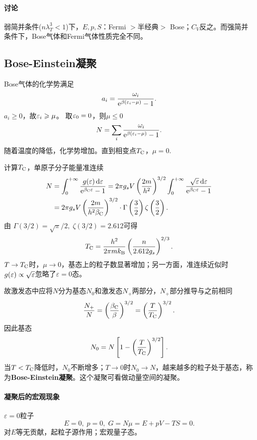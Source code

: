 \paragraph*{讨论}弱简并条件($n\lambda_T^3<1$)下，$E,p,S$：Fermi $>$半经典$>$ Bose；$C_V$反之。而强简并条件下，Bose气体和Fermi气体性质完全不同。
\subsection{Bose-Einstein凝聚}
Bose气体的化学势满足
\[
	a_i=\frac{\omega_i}{\mathop{}\!\mathrm{e}^{\beta(\varepsilon_i-\mu)}-1}.
\]
$a_i\geqslant 0$，故$\varepsilon_i\geqslant \mu$。
取$\varepsilon_0=0$，则$\mu\leqslant 0$
\[
	N=\sum_i\frac{\omega_i}{\mathop{}\!\mathrm{e}^{\beta(\varepsilon_i-\mu)}-1}.
\]
随着温度的降低，化学势增加。直到相变点$T_\mathrm C$，$\mu=0$.

计算$T_\mathrm C$，单原子分子能量准连续
\begin{align*}
	N&=\int_0^{+\infty}\frac{g(\varepsilon)\mathop{}\!\mathrm{d}\varepsilon}{\mathop{}\!\mathrm{e}^{\beta_\mathrm C\varepsilon}-1}=2\pi g_sV\left(\frac{2m}{h^2}\right)^{3/2}\int_0^{+\infty}\frac{\sqrt\varepsilon\mathop{}\!\mathrm{d}\varepsilon}{\mathop{}\!\mathrm{e}^{\beta_\mathrm C\varepsilon}-1}\\
	&=2\pi g_sV\left(\frac{2m}{h^2\beta_\mathrm C}\right)^{3/2}\cdot\Gamma\left(\frac32\right)\zeta\left(\frac32\right).
\end{align*}
由
$\Gamma(3/2)=\sqrt\pi/2,\;\zeta(3/2)=2.612$可得
\begin{align}\label{Bose-TC}
	T_\mathrm C=\frac{h^2}{2\pi mk_{\mathrm B}}\left(\frac n{2.612g_s}\right)^{2/3}.
\end{align}
$T\to T_\mathrm C$时，$\mu\to0$，基态上的粒子数显著增加；另一方面，准连续近似时$g(\varepsilon)\propto\sqrt\varepsilon$忽略了$\varepsilon=0$态。

故激发态中应将$N$分为基态$N_0$和激发态$N_+$两部分，$N_+$部分推导与之前相同
\[
	\frac{N_+}N=\left(\frac{\beta_\mathrm C}\beta\right)^{3/2}=\left(\frac T{T_\mathrm C}\right)^{3/2}.
\]
因此基态
\begin{align}
	N_0=N\left[1-\left(\frac T{T_\mathrm C}\right)^{3/2}\right].
\end{align}
当$T<T_\mathrm C$降低时，$N_0$不断增多；$T\to 0$时$N_0\to N$，越来越多的粒子处于基态，称为\textbf{Bose-Einstein凝聚}。这个凝聚可看做动量空间的凝聚。

\paragraph*{凝聚后的宏观现象}$\varepsilon=0$粒子
\[
	E=0,\;p=0,\;G=N\mu=E+pV-TS=0.
\]
对$E$等无贡献，起粒子源作用；宏观量子态。

